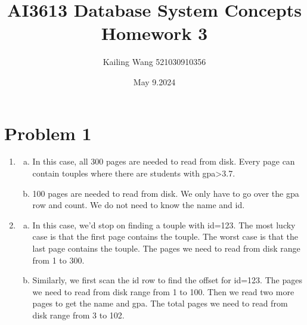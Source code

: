 \documentclass{article}
\begin{document}
\title{AI3613 Database System Concepts Homework 3}
\author{Kailing Wang 521030910356}
\date{May 9.2024}
\maketitle

\section*{Problem 1}

\begin{enumerate}[1.]
	\item
	      \begin{enumerate}[(a)]
		      \item In this case, all 300 pages are needed to read from disk. Every page can contain touples where there are students with gpa>3.7.
		      \item 100 pages are needed to read from disk. We only have to go over the gpa row and count. We do not need to know the name and id.
	      \end{enumerate}

	\item
	      \begin{enumerate}[(a)]
		      \item In this case, we'd stop on finding a touple with id=123. The most lucky case is that the first page contains the touple. The worst case is that the last page contains the touple. The pages we need to read from disk range from 1 to 300.
		      \item Similarly, we first scan the id row to find the offset for id=123. The pages we need to read from disk range from 1 to 100. Then we read two more pages to get the name and gpa. The total pages we need to read from disk range from 3 to 102.
	      \end{enumerate}
\end{enumerate}
\end{document}
